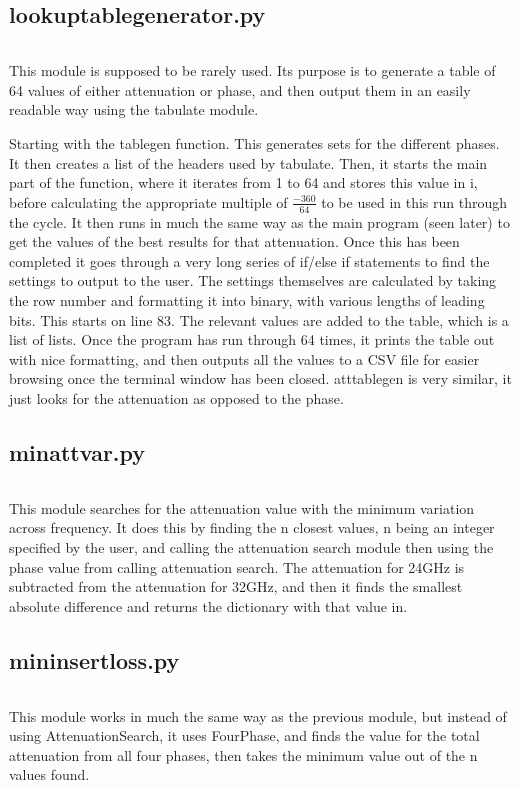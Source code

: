 \documentclass{article}
\begin{document}
\subsection{lookuptablegenerator.py}
\inputminted[linenos, breaklines]{python}{../lookuptablegenerator.py}
This module is supposed to be rarely used. Its purpose is to generate a table of 64 values of either attenuation or phase, and then output them in an easily readable way
using the tabulate module. \par Starting with the tablegen function. This generates sets for the different phases. It then creates a list of the headers used by tabulate.
Then, it starts the main part of the function, where it iterates from 1 to 64 and stores this value in i, before calculating the appropriate multiple of $\frac{-360}{64}$
to be used in this run through the cycle. It then runs in much the same way as the main program (seen later) to get the values of the best results for that attenuation.
Once this has been completed it goes through a very long series of if/else if statements to find the settings to output to the user. The settings themselves are calculated by
taking the row number and formatting it into binary, with various lengths of leading bits. This starts on line 83. The relevant values are added to the table, which is a list
of lists. Once the program has run through 64 times, it prints the table out with nice formatting, and then outputs all the values to a CSV file for easier browsing once the
terminal window has been closed. atttablegen is very similar, it just looks for the attenuation as opposed to the phase.
\subsection{minattvar.py}
\inputminted[linenos, breaklines]{python}{../minattvar.py}
This module searches for the attenuation value with the minimum variation across frequency. It does this by finding the n closest values, n being an integer specified by the
 user, and calling the attenuation search module then using the phase value from calling attenuation search. The attenuation for 24GHz is subtracted from the attenuation for
 32GHz, and then it finds the smallest absolute difference and returns the dictionary with that value in.
 \subsection{mininsertloss.py}
 \inputminted[linenos, breaklines]{python}{../mininsertloss.py}
This module works in much the same way as the previous module, but instead of using AttenuationSearch, it uses FourPhase, and finds the value for the total attenuation from
all four phases, then takes the minimum value out of the n values found.
\end{document}
